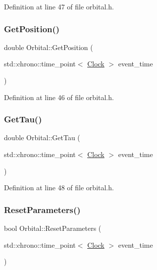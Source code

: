 Definition at line 47 of file orbital.\+h.

\mbox{\label{class_orbital_aea872758f844534806a638080a39507e}} 
\subsubsection{\texorpdfstring{Get\+Position()}{GetPosition()}}
{\footnotesize\ttfamily double Orbital\+::\+Get\+Position (\begin{DoxyParamCaption}\item[{std\+::chrono\+::time\+\_\+point$<$ \hyperlink{universe_8h_a0ef8d951d1ca5ab3cfaf7ab4c7a6fd80}{Clock} $>$}]{event\+\_\+time }\end{DoxyParamCaption})\hspace{0.3cm}{\ttfamily [inline]}}



Definition at line 46 of file orbital.\+h.

\mbox{\label{class_orbital_aeb7758cc920cb862fdc33374c26cb585}} 
\subsubsection{\texorpdfstring{Get\+Tau()}{GetTau()}}
{\footnotesize\ttfamily double Orbital\+::\+Get\+Tau (\begin{DoxyParamCaption}\item[{std\+::chrono\+::time\+\_\+point$<$ \hyperlink{universe_8h_a0ef8d951d1ca5ab3cfaf7ab4c7a6fd80}{Clock} $>$}]{event\+\_\+time }\end{DoxyParamCaption})\hspace{0.3cm}{\ttfamily [inline]}}



Definition at line 48 of file orbital.\+h.

\mbox{\label{class_orbital_acc6137a5a79be91a255f685a2f065330}} 
\subsubsection{\texorpdfstring{Reset\+Parameters()}{ResetParameters()}}
{\footnotesize\ttfamily bool Orbital\+::\+Reset\+Parameters (\begin{DoxyParamCaption}\item[{std\+::chrono\+::time\+\_\+point$<$ \hyperlink{universe_8h_a0ef8d951d1ca5ab3cfaf7ab4c7a6fd80}{Clock} $>$}]{event\+\_\+time }\end{DoxyParamCaption})}



